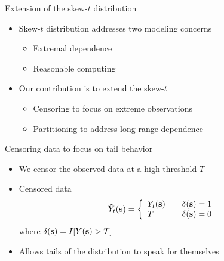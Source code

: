 \documentclass{beamer}
\begin{document}
\begin{frame}{Extension of the skew-$t$ distribution}
  \begin{itemize} \setlength{\itemsep}{1em}
    \item Skew-$t$ distribution addresses two modeling concerns
    \begin{itemize}
      \item Extremal dependence
      \item Reasonable computing
    \end{itemize}
    \item Our contribution is to extend the skew-$t$
    \begin{itemize}
      \item Censoring to focus on extreme observations
      \item Partitioning to address long-range dependence
    \end{itemize}
  \end{itemize}
\end{frame}

\begin{frame}{Censoring data to focus on tail behavior}
  \begin{itemize} \setlength{\itemsep}{1em}
    \item We censor the observed data at a high threshold $T$
    \item Censored data
    \begin{align*}
      \tilde{Y}_t(\mbox{\bf s}) = \left\{ \begin{array}{ll}
          Y_t(\mbox{\bf s}) \quad & \delta(\mbox{\bf s}) = 1\\
          T \quad & \delta(\mbox{\bf s}) = 0
      \end{array}\right.
    \end{align*}
    where $\delta(\mbox{\bf s}) = I[Y(\mbox{\bf s}) > T]$
    \item Allows tails of the distribution to speak for themselves
  \end{itemize}
\end{frame}
\end{document}
